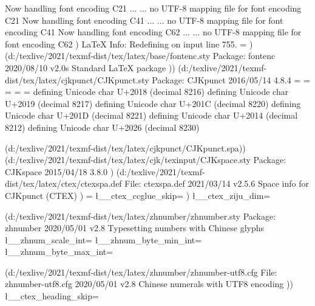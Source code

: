Now handling font encoding C21 ...
... no UTF-8 mapping file for font encoding C21
Now handling font encoding C41 ...
... no UTF-8 mapping file for font encoding C41
Now handling font encoding C62 ...
... no UTF-8 mapping file for font encoding C62
)
LaTeX Info: Redefining \selectfont on input line 755.
\CJK@indent=
)
(d:/texlive/2021/texmf-dist/tex/latex/base/fontenc.sty
Package: fontenc 2020/08/10 v2.0s Standard LaTeX package
))
(d:/texlive/2021/texmf-dist/tex/latex/cjkpunct/CJKpunct.sty
Package: CJKpunct 2016/05/14 4.8.4
\CJKpunct@cnta=
\CJKpunct@cntb=
\CJKpunct@cntc=
\CJKpunct@cntd=
\CJKpunct@cnte=
   defining Unicode char U+2018 (decimal 8216)
   defining Unicode char U+2019 (decimal 8217)
   defining Unicode char U+201C (decimal 8220)
   defining Unicode char U+201D (decimal 8221)
   defining Unicode char U+2014 (decimal 8212)
   defining Unicode char U+2026 (decimal 8230)

(d:/texlive/2021/texmf-dist/tex/latex/cjkpunct/CJKpunct.spa))
(d:/texlive/2021/texmf-dist/tex/latex/cjk/texinput/CJKspace.sty
Package: CJKspace 2015/04/18 3.8.0
)
(d:/texlive/2021/texmf-dist/tex/latex/ctex/ctexspa.def
File: ctexspa.def 2021/03/14 v2.5.6 Space info for CJKpunct (CTEX)
)
\ccwd=
\l__ctex_ccglue_skip=
)
\l__ctex_ziju_dim=

(d:/texlive/2021/texmf-dist/tex/latex/zhnumber/zhnumber.sty
Package: zhnumber 2020/05/01 v2.8 Typesetting numbers with Chinese glyphs
\l__zhnum_scale_int=
\l__zhnum_byte_min_int=
\l__zhnum_byte_max_int=

(d:/texlive/2021/texmf-dist/tex/latex/zhnumber/zhnumber-utf8.cfg
File: zhnumber-utf8.cfg 2020/05/01 v2.8 Chinese numerals with UTF8 encoding
))
\l__ctex_heading_skip=

